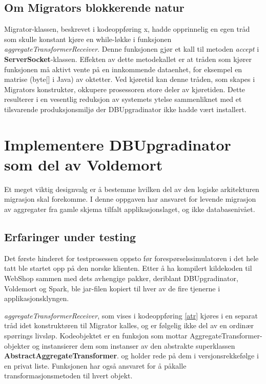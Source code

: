 \subsection*{Om Migrators blokkerende natur}

Migrator-klassen, beskrevet i kodeoppføring x, hadde opprinnelig en egen tråd som skulle konstant kjøre en while-løkke i funksjonen \emph{aggregateTransformerReceiver}. Denne funksjonen gjør et kall til metoden \emph{accept} i \textbf{ServerSocket}-klassen. Effekten av dette metodekallet er at tråden som kjører funksjonen må aktivt vente på en innkommende dataenhet, for eksempel en matrise (byte[] i Java) av oktetter. Ved kjøretid kan denne tråden, som skapes i Migrators konstruktør, okkupere prosessoren store deler av kjøretiden. Dette resulterer i en vesentlig reduksjon av systemets ytelse sammenliknet med et tilsvarende produksjonsmiljø der DBUpgradinator ikke hadde vært installert.



\section*{Implementere DBUpgradinator som del av Voldemort}

Et meget viktig designvalg er å bestemme hvilken del av den logiske arkitekturen migrasjon skal forekomme. I denne oppgaven har ansvaret for levende migrasjon av aggregater fra gamle skjema tilfalt applikasjonslaget, og ikke databasenivået. 


\subsection*{Erfaringer under testing}

Det første hinderet for testprosessen oppsto før forespørselssimulatoren i det hele tatt ble startet opp på den norske klienten. Etter å ha kompilert kildekoden til WebShop sammen med dets avhengige pakker, deriblant DBUpgradinator, Voldemort og Spark, ble jar-filen kopiert til hver av de fire tjenerne i applikasjonsklyngen.



\emph{aggregateTransformerReceiver}, som vises i kodeoppføring \ref{atr} kjøres i en separat tråd idet konstruktøren til Migrator kalles, og er følgelig ikke del av en ordinær spørrings livsløp. Kodeobjektet er en funksjon som mottar AggregateTransformer-objekter og instansierer dem som instanser av den abstrakte superklassen \textbf{AbstractAggregateTransformer}. og holder rede på dem i versjonsrekkefølge i en privat liste. Funksjonen har også ansvaret for å påkalle transformasjonsmetoden til hvert objekt.

